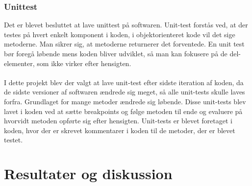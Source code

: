 \subsubsection{Unittest}
Det er blevet besluttet at lave unittest på softwaren. Unit-test forstås ved, at der testes på hvert enkelt komponent i koden, i objektorienteret kode vil det sige metoderne. Man sikrer sig, at metoderne returnerer det forventede. En unit test bør foregå løbende mens koden bliver udviklet, så man kan fokusere på de del-elementer, som ikke virker efter hensigten. \\
\\
I dette projekt blev der valgt at lave unit-test efter sidste iteration af koden, da de sidste versioner af softwaren ændrede sig meget, så alle unit-tests skulle laves forfra. Grundlaget for mange metoder ændrede sig løbende. Disse unit-tests blev lavet i koden ved at sætte breakpoints og følge metoden til ende og evaluere på hvorvidt metoden opførte sig efter hensigten. Unit-tests er blevet foretaget i koden, hvor der er skrevet kommentarer i koden til de metoder, der er blevet testet.
\section{Resultater og diskussion}
